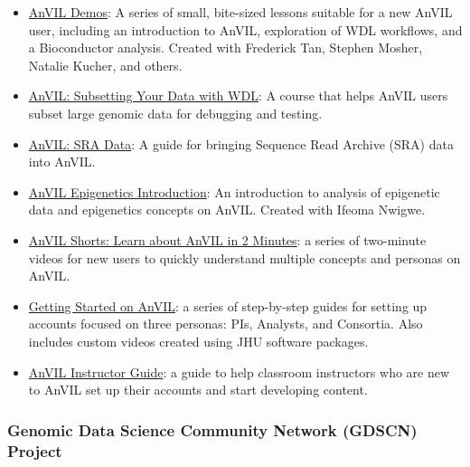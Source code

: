 \documentclass{cv}
\begin{document}
\begin{itemize}

\item \href{https://hutchdatascience.org/AnVIL_Demos/}{AnVIL Demos}: A series of small, bite-sized lessons suitable for a new AnVIL user, including an introduction to AnVIL, exploration of WDL workflows, and a Bioconductor analysis. Created with Frederick Tan, Stephen Mosher, Natalie Kucher, and others.

\item \href{https://hutchdatascience.org/AnVIL_Data_Subsetting}{AnVIL: Subsetting Your Data with WDL}: A course that helps AnVIL users subset large genomic data for debugging and testing.

\item \href{https://hutchdatascience.org/AnVIL_SRA_Data/}{AnVIL: SRA Data}: A guide for bringing Sequence Read Archive (SRA) data into AnVIL.

\item \href{https://hutchdatascience.org/AnVIL_Book_Epigenetics_Intro/}{AnVIL Epigenetics Introduction}: An introduction to analysis of epigenetic data and epigenetics concepts on AnVIL. Created with Ifeoma Nwigwe.

\item \href{https://www.youtube.com/watch?v=tVh93e6TzCE\&list=PL6aYJ_0zJ4uCABkMngSYjPo_3c-nUUmio}{AnVIL Shorts: Learn about AnVIL in 2 Minutes}: a series of two-minute videos for new users to quickly understand multiple concepts and personas on AnVIL.

\item \href{https://jhudatascience.org/AnVIL_Book_Getting_Started/}{Getting Started on AnVIL}: a series of step-by-step guides for setting up accounts focused on three personas: PIs, Analysts, and Consortia. Also includes custom videos created using JHU software packages.

\item \href{https://jhudatascience.org/AnVIL_Book_Instructor_Guide/}{AnVIL Instructor Guide}: a guide to help classroom instructors who are new to AnVIL set up their accounts and start developing content.

\end{itemize}

\subsubsection*{Genomic Data Science Community Network (GDSCN) Project}
\end{document}
